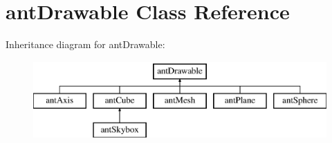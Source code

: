 \hypertarget{classant_drawable}{\section{ant\+Drawable Class Reference}
\label{classant_drawable}
}
Inheritance diagram for ant\+Drawable\+:\begin{figure}[H]
\begin{center}
\leavevmode
\includegraphics[height=3.000000cm]{classant_drawable}
\end{center}
\end{figure}
